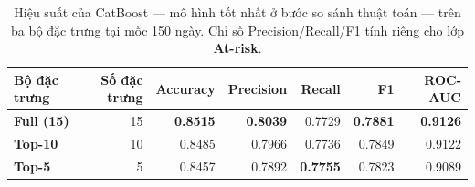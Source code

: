 \begin{table}[H]
  \centering
  \caption{Hiệu suất của CatBoost --- mô hình tốt nhất ở bước so sánh thuật toán --- trên ba bộ đặc trưng tại mốc 150 ngày. Chỉ số Precision/Recall/F1 tính riêng cho lớp \textbf{At-risk}.}
  \label{tab:compare_featuresets}
  \small
  \setlength{\tabcolsep}{5pt}
  \begin{tabular}{lrrrrrr}
    \toprule
    \textbf{Bộ đặc trưng} & \textbf{Số đặc trưng} & \textbf{Accuracy} & \textbf{Precision} & \textbf{Recall} & \textbf{F1} & \textbf{ROC-AUC} \\
    \midrule
    \textbf{Full (15)} & 15 & \textbf{0.8515} & \textbf{0.8039} & 0.7729 & \textbf{0.7881} & \textbf{0.9126} \\
    \textbf{Top-10} & 10 & 0.8485 & 0.7966 & 0.7736 & 0.7849 & 0.9122 \\
    \textbf{Top-5} & 5 & 0.8457 & 0.7892 & \textbf{0.7755} & 0.7823 & 0.9089 \\
    \bottomrule
  \end{tabular}
\end{table}
